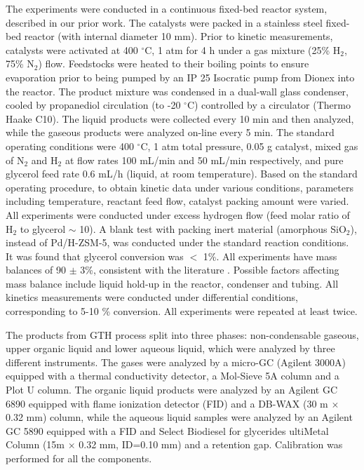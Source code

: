 \documentclass[journal=iecred,manuscript=article]{achemso}
\begin{document}
The experiments were conducted in a continuous fixed-bed reactor system,
described in our prior work. \cite{Xiao2016}
The catalysts were packed in a stainless steel fixed-bed reactor (with internal diameter 10 mm).
Prior to kinetic measurements, 
catalysts were activated at 400 $^{\circ}$C, 1 atm for 4 h under a gas mixture  (25\% H$_2$, 75\% N$_2$) flow.
Feedstocks were heated to their boiling points to ensure evaporation prior to being pumped by an IP 25 Isocratic pump from Dionex into the reactor.
The product mixture was condensed in a dual-wall glass condenser, cooled by propanediol circulation (to -20 $^{\circ}$C) controlled by a circulator (Thermo Haake C10).
The liquid products were collected every 10 min and then analyzed,
while the gaseous products were analyzed on-line every 5 min.
The standard operating conditions were 400 $^{\circ}$C, 1 atm total pressure,
0.05 g catalyst, mixed gas of N$_2$ and H$_2$ at flow rates 100 mL/min and 50 mL/min respectively,
and pure glycerol feed rate 0.6 mL/h (liquid, at room temperature).
Based on the standard operating procedure, to obtain kinetic data under various conditions, parameters including temperature, reactant feed flow, catalyst packing amount were varied.
All experiments were conducted under excess hydrogen flow (feed molar ratio of H$_2$ to glycerol $\sim$ 10).
A blank test with packing inert material (amorphous SiO$_2$), instead of Pd/H-ZSM-5, was conducted under the standard reaction conditions.
It was found that glycerol conversion was $<$ 1\%.
All experiments have mass balances of 90 $\pm$ 3\%,
consistent with the literature \cite{Jongerius2013}.
Possible factors affecting mass balance include liquid hold-up in the reactor, condenser and tubing.
All kinetics measurements were conducted under differential conditions, corresponding to 5-10 \% conversion.
All experiments were repeated at least twice.
        
The products from GTH process split into three phases: non-condensable gaseous, upper organic liquid and lower aqueous liquid, 
which were analyzed by three different instruments.
The gases were analyzed by a micro-GC (Agilent 3000A) equipped with a thermal conductivity detector, a Mol-Sieve 5A column and a Plot U column.
The organic liquid products were analyzed by an Agilent GC 6890 equipped with flame ionization detector (FID) and a DB-WAX (30 m $\times$ 0.32 mm) column,
while the aqueous liquid samples were analyzed by an Agilent GC 5890 equipped with a FID and Select Biodiesel for glycerides ultiMetal Column (15m $\times$ 0.32 mm, ID=0.10 mm) and a retention gap. 
Calibration was performed for all the components. 
\end{document}
